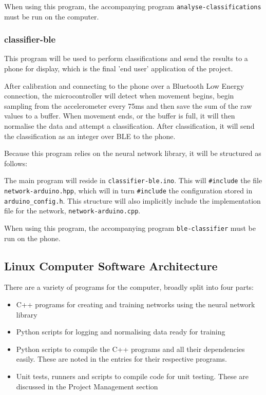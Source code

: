 \documentclass[a4paper]{article}
\begin{document}

When using this program, the accompanying program \lstinline{analyse-classifications} must be run on the computer. 

\subsubsection{classifier-ble}

This program will be used to perform classifications and send the results to a phone for display, which is the final 'end user' application of the project.

After calibration and connecting to the phone over a Bluetooth Low Energy connection, the microcontroller will detect when movement begins, begin sampling from the accelerometer every 75ms and then save the sum of the raw values to a buffer. When movement ends, or the buffer is full, it will then normalise the data and attempt a classification. After classification, it will send the classification as an integer over BLE to the phone.

Because this program relies on the neural network library, it will be structured as follows:

The main program will reside in \lstinline{classifier-ble.ino}. This will \lstinline{#include} the file \lstinline{network-arduino.hpp}, which will in turn \lstinline{#include} the configuration stored in \lstinline{arduino_config.h}. 
This structure will also implicitly include the implementation file for the network, \lstinline{network-arduino.cpp}.


When using this program, the accompanying program \lstinline{ble-classifier} must be run on the phone. 

\subsection{Linux Computer Software Architecture}%

There are a variety of programs for the computer, broadly split into four parts:

\begin{itemize}
\item C++ programs for creating and training networks using the neural network library
\item Python scripts for logging and normalising data ready for training
\item Python scripts to compile the C++ programs and all their dependencies easily. These are noted in the entries for their respective programs.
\item Unit tests, runners and scripts to compile code for unit testing. These are discussed in the Project Management section 
\end{itemize}
\end{document}
